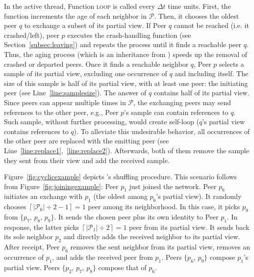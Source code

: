 In the active thread, Function \textsc{loop} is called every $\Delta t$ time
units. First, the function increments the age of each neighbor in
$\mathcal{P}$. Then, it chooses the oldest peer $q$ to exchange a
subset of its partial view. If Peer $q$ cannot be reached (i.e. it
crashed/left), peer $p$ executes the crash-handling function
(see Section~\ref{subsec:leaving}) and repeats the process until it
finds a reachable peer $q$. Thus, the aging process (which is an
inheritance from \CYCLON) speeds up the removal of crashed or departed
peers. Once it finds a reachable neighbor $q$, Peer $p$ selects a
sample of its partial view, excluding one occurrence of $q$ and
including itself. The size of this sample is half of its partial view,
with at least one peer: the initiating peer
(see Line~\ref{line:samplesize}). The answer of $q$ contains half of
its partial view. Since peers can appear multiple times in
$\mathcal{P}$, the exchanging peers may send references to the other
peer, e.g., Peer $p$'s sample can contain references to $q$. Such
sample, without further processing, would create self-loop ($q$'s
partial view contains references to $q$). To alleviate this
undesirable behavior, all occurrences of the other peer are replaced
with the emitting peer
(see Line~\ref{line:replace1},~\ref{line:replace2}).  Afterwards, both
of them remove the sample they sent from their view and add the
received sample.

\begin{figure*}
  \centering
  \hspace{10pt}
  \hspace{10pt}
  \caption{\label{fig:cyclicexample}Example of the shuffling
    protocol of \SPRAY. }
\end{figure*}

Figure~\ref{fig:cyclicexample} depicts \SPRAY's shuffling procedure. This
scenario follows from Figure~\ref{fig:joiningexample}: Peer $p_1$ just joined
the network. Peer $p_6$ initiates an exchange with $p_1$ (the oldest among 
$p_6$'s partial view). It randomly chooses
$\left\lceil{|\mathcal{P}_6|\div 2} - 1 \right \rceil = 1$ peer among its
neighborhood. In this case, it picks $p_9$ from $\{p_7,\,p_8,\,p_9\}$.  It sends
the chosen peer plus its own identity to Peer $p_1$. In response, the latter
picks $\left\lceil{|\mathcal{P}_1|\div 2}\right\rceil = 1$ peer from its partial
view. It sends back its sole neighbor $p_2$ and directly adds the received
neighbor to its partial view. After receipt, Peer $p_6$ removes the sent
neighbor from its partial view, removes an occurrence of $p_1$, and adds the
received peer from $p_1$. Peers $\{p_6,\,p_9\}$ compose $p_1$'s partial
view. Peers $\{p_2,\,p_7,\,p_8\}$ compose that of $p_6$.

